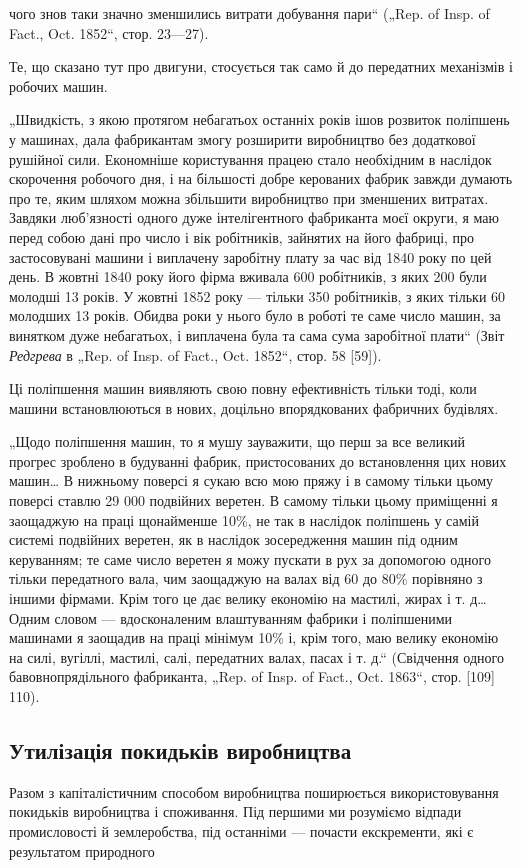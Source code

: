 \parcont{}  %
чого знов таки значно зменшились витрати добування пари“
(„Rep. of Insp. of Fact., Oct. 1852“, стор. 23—27).

Те, що сказано тут про двигуни, стосується так само й до
передатних механізмів і робочих машин.

„Швидкість, з якою протягом небагатьох останніх років
ішов розвиток поліпшень у машинах, дала фабрикантам змогу
розширити виробництво без додаткової рушійної сили. Економніше користування працею стало необхідним
в наслідок скорочення робочого дня, і на більшості добре керованих фабрик завжди думають про те,
яким шляхом можна збільшити
виробництво при зменшених витратах. Завдяки люб’язності одного
дуже інтелігентного фабриканта моєї округи, я маю перед собою дані про число і вік робітників,
зайнятих на його фабриці,
про застосовувані машини і виплачену заробітну плату за час
від 1840 року по цей день. В жовтні 1840 року його фірма
вживала 600 робітників, з яких 200 були молодші 13 років.
У жовтні 1852 року — тільки 350 робітників, з яких тільки 60
молодших 13 років. Обидва роки у нього було в роботі те саме
число машин, за винятком дуже небагатьох, і виплачена була та
сама сума заробітної плати“ (Звіт \emph{Редгрева} в „Rep. of Insp. of
Fact., Oct. 1852“, стор. 58 [59]).

Ці поліпшення машин виявляють свою повну ефективність
тільки тоді, коли машини встановлюються в нових, доцільно
впорядкованих фабричних будівлях.

„Щодо поліпшення машин, то я мушу зауважити, що перш
за все великий прогрес зроблено в будуванні фабрик, пристосованих до встановлення цих нових машин\dots{}
В нижньому поверсі
я сукаю всю мою пряжу і в самому тільки цьому поверсі
ставлю 29 000 подвійних веретен. В самому тільки цьому приміщенні я заощаджую на праці щонайменше
10\%, не так в наслідок поліпшень у самій системі подвійних веретен, як в наслідок зосередження машин
під одним керуванням; те саме число
веретен я можу пускати в рух за допомогою одного тільки
передатного вала, чим заощаджую на валах від 60 до 80\% порівняно з іншими фірмами. Крім того це дає
велику економію
на мастилі, жирах і т. д\dots{} Одним словом — вдосконаленим
влаштуванням фабрики і поліпшеними машинами я заощадив на
праці мінімум 10\% і, крім того, маю велику економію на силі,
вугіллі, мастилі, салі, передатних валах, пасах і т. д.“ (Свідчення
одного бавовнопрядільного фабриканта, „Rep. of Insp. of Fact.,
Oct. 1863“, стор. [109] 110).

\subsection{Утилізація покидьків виробництва}

Разом з капіталістичним способом виробництва поширюється
використовування покидьків виробництва і споживання. Під першими ми розуміємо відпади промисловості
й землеробства, під
останніми — почасти екскременти, які є результатом природного
\parbreak{}  %
